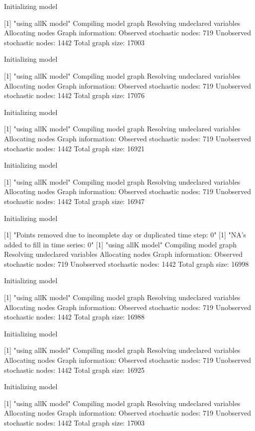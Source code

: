 \documentclass[11pt,lineno]{manuscript}\usepackage[]{graphicx}\usepackage[]{xcolor}
\begin{document}
Initializing model

[1] "using allK model"
Compiling model graph
   Resolving undeclared variables
   Allocating nodes
Graph information:
   Observed stochastic nodes: 719
   Unobserved stochastic nodes: 1442
   Total graph size: 17003

Initializing model

[1] "using allK model"
Compiling model graph
   Resolving undeclared variables
   Allocating nodes
Graph information:
   Observed stochastic nodes: 719
   Unobserved stochastic nodes: 1442
   Total graph size: 17076

Initializing model

[1] "using allK model"
Compiling model graph
   Resolving undeclared variables
   Allocating nodes
Graph information:
   Observed stochastic nodes: 719
   Unobserved stochastic nodes: 1442
   Total graph size: 16921

Initializing model

[1] "using allK model"
Compiling model graph
   Resolving undeclared variables
   Allocating nodes
Graph information:
   Observed stochastic nodes: 719
   Unobserved stochastic nodes: 1442
   Total graph size: 16947

Initializing model

[1] "Points removed due to incomplete day or duplicated time step: 0"
[1] "NA's added to fill in time series: 0"
[1] "using allK model"
Compiling model graph
   Resolving undeclared variables
   Allocating nodes
Graph information:
   Observed stochastic nodes: 719
   Unobserved stochastic nodes: 1442
   Total graph size: 16998

Initializing model

[1] "using allK model"
Compiling model graph
   Resolving undeclared variables
   Allocating nodes
Graph information:
   Observed stochastic nodes: 719
   Unobserved stochastic nodes: 1442
   Total graph size: 16988

Initializing model

[1] "using allK model"
Compiling model graph
   Resolving undeclared variables
   Allocating nodes
Graph information:
   Observed stochastic nodes: 719
   Unobserved stochastic nodes: 1442
   Total graph size: 16925

Initializing model

[1] "using allK model"
Compiling model graph
   Resolving undeclared variables
   Allocating nodes
Graph information:
   Observed stochastic nodes: 719
   Unobserved stochastic nodes: 1442
   Total graph size: 17003
\end{document}
